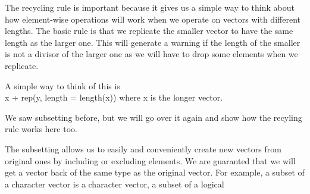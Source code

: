\documentclass[coloremph,lightbackground,landscape,17pt]{foils}
\begin{document}
The recycling rule is important because it gives us a simple way to
think about how element-wise operations will work when we operate on
vectors with different lengths.  The basic rule is that we replicate
the smaller vector to have the same length as the larger one.  This
will generate a warning if the length of the smaller is not a divisor
of the larger one as we will have to drop some elements when we
replicate.

A simple way to think of this is \\
 x + rep(y, length = length(x))
where x is the longer vector.
 


We saw subsetting before, but we will go over it again
and show how the recyling rule works here too.

The subsetting allows us to easily and conveniently create new vectors
from original ones by including or excluding elements.  We are
guaranted that we will get a vector back of the same type as the
original vector.  For example, a subset of a character vector is a
character vector, a subset of a logical
\end{document}
